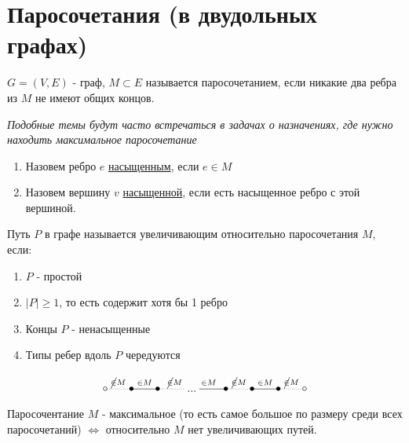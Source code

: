 
\section{Паросочетания (в двудольных графах)}

\begin{definition}
$G = (V, E)$ - граф, $M \subset E$ называется паросочетанием, если никакие два ребра из $M$ не имеют общих концов. 
\end{definition}

\textit{Подобные темы будут часто встречаться в задачах о назначениях, где нужно находить максимальное паросочетание}

\begin{definition}
  \text{}

  \begin{enumerate}
    \item  Назовем ребро $e$ \underline{насыщенным}, если $e \in M$
    \item Назовем вершину $v$ \underline{насыщенной}, если есть насыщенное ребро с этой вершиной.
  \end{enumerate}
 
\end{definition}

\begin{definition}
  Путь $P$ в графе называется увеличивающим относительно паросочетания $M$, если:

  \begin{enumerate}
    \item $P$ - простой
    \item $|P| \ge 1$, то есть содержит хотя бы 1 ребро
    \item Концы $P$ - ненасыщенные
    \item Типы ребер вдоль $P$ чередуются
  \end{enumerate}
\end{definition}
$$\xymatrix{
  *={\circ} \ar@{.}^{\cancel \in M}[r] &  *={\bullet} \ar@{-}^{\in M}[r] & *={\bullet} \ar@{.}^{\cancel \in M}[r] & ... \ar@{-}^{\in M}[r]  & *={\bullet} \ar@{.}^{\cancel \in M}[r] & *={\bullet} \ar@{-}^{\in M}[r] & *={\bullet} \ar@{.}^{\cancel \in M}[r] &*={\circ}
}$$

\begin{theorem}[Берж]
  Паросочентание $M$ - максимальное (то есть самое большое по размеру среди всех паросочетаний) $\Longleftrightarrow$ относительно $M$ нет увеличивающих путей.
\end{theorem}

